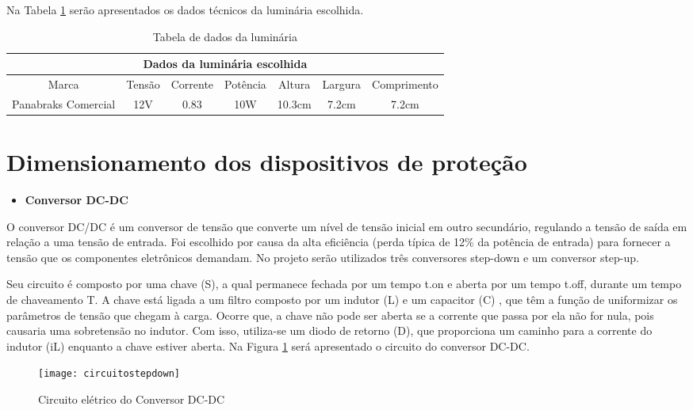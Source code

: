 Na Tabela \ref{tab:luminaria} serão apresentados os dados técnicos da luminária escolhida.
    \begin{table}[H]
    \label{tab:luminaria}

\begin{tabular}{|c|c|c|c|c|c|c|}
\hline
\multicolumn{7}{|c|}{Dados da luminária escolhida}                                                 \\ \hline
Marca             & Tensão         & Corrente & Potência & Altura & Largura & Comprimento \\ \hline
Panabraks Comercial  & 12V  & 0.83          & 10W   & 10.3cm & 7.2cm & 7.2cm \\ \hline

\end{tabular}
    \caption{Tabela de dados da luminária}
\end{table}
\FloatBarrier

\section{Dimensionamento dos dispositivos de proteção}

\begin{itemize}
    \item \textbf{Conversor DC-DC}
\end{itemize}
O conversor DC/DC  é um conversor de tensão que converte um nível de tensão inicial em outro secundário, regulando a tensão de saída em relação a uma tensão de entrada. Foi escolhido por causa da alta eficiência (perda típica de 12\% da potência de entrada) para fornecer a tensão que os componentes eletrônicos demandam. No projeto serão utilizados três conversores step-down e um conversor step-up.
    
Seu circuito é composto por uma chave (S), a qual permanece fechada por um tempo t.on e aberta por um tempo t.off, durante um tempo de chaveamento T. A chave está ligada a um filtro composto por um indutor (L) e um capacitor (C) , que têm a função de uniformizar os parâmetros de tensão que chegam à carga. Ocorre que, a chave não pode ser aberta se a corrente que passa por ela não for nula, pois causaria uma sobretensão no indutor. Com isso, utiliza-se um diodo de retorno (D), que proporciona um caminho para a corrente do indutor (iL) enquanto a chave estiver aberta. Na Figura \ref{fig:circuitostepdown} será apresentado o circuito do conversor DC-DC.

\begin{figure}[H]
\centering
\texttt{[image: circuitostepdown]}
    \caption{Circuito elétrico do Conversor DC-DC}
\label{fig:circuitostepdown}
\end{figure}
\FloatBarrier

